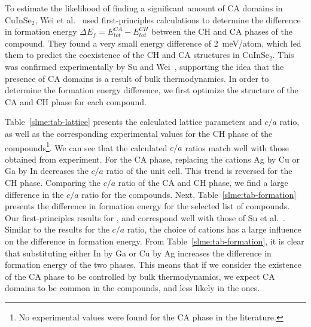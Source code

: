 \begin{refsection}
To estimate the likelihood of finding a significant amount of CA domains in 
CuInSe$_2$, Wei et al.~\cite{Wei1999} used first-principles calculations to 
determine the difference in formation energy $\Delta E_f = E_{tot}^{CA} - 
E_{tot}^{CH}$ between the CH and CA phases of the compound. They found a very 
small energy difference of 2~\si{\milli\electronvolt}/atom, which led them to 
predict the coexistence of the CH and CA structures in CuInSe$_2$. This was 
confirmed experimentally by Su and Wei~\cite{Su1999}, supporting the idea that 
the presence of CA domains is a result of bulk thermodynamics. In order to 
determine the formation energy difference, we first optimize the structure of 
the CA and CH phase for each compound. 
 
Table~\ref{slme:tab-lattice} presents the calculated lattice parameters and 
$c/a$ ratio, as well as the corresponding experimental values 
for the CH phase of the compounds\footnote[3]{No experimental values were 
found for the CA phase in the literature.}. We can see that the calculated 
$c/a$ ratios match well with those obtained from experiment. For the CA phase, 
replacing the cations Ag by Cu or Ga by In decreases the $c/a$ ratio of the 
unit cell. This trend is reversed for the CH phase. Comparing the $c/a$ 
ratio of the CA and CH phase, we find a large difference in the $c/a$ ratio 
for the \mbox{} compounds. Next, Table~\ref{slme:tab-formation} 
presents the difference in formation energy for the selected list of 
compounds. Our first-principles results for ,  and 
 correspond well with those of Su et al.~\cite{Su2000}. Similar to 
the results for the $c/a$ ratio, the choice of cations has a large influence 
on the difference in formation energy. From Table~\ref{slme:tab-formation}, it is
clear that substituting either In by Ga or Cu by Ag increases the difference 
in formation energy of the two phases. This means that if we consider the 
existence of the CA phase to be controlled by bulk thermodynamics, we expect 
CA domains to be common in the \mbox{} compounds, and less likely 
in the \mbox{} ones.  


\end{refsection}
